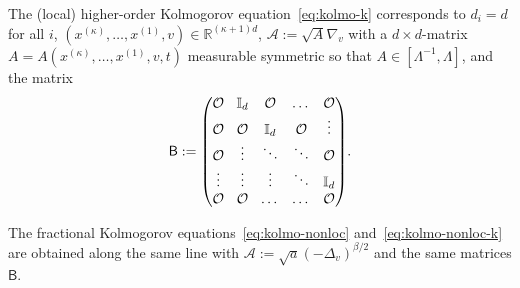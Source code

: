 \documentclass[10pt]{amsart}
\theoremstyle{definition}
\newcommand\R{{\mathbb R}}
\newcommand{\cA}{{\mathcal A}}
\newcommand{\sB}{{\mathsf B}}
\begin{document}
The (local) higher-order Kolmogorov equation~\eqref{eq:kolmo-k}
corresponds to $d_i=d$ for all $i$,
$(x^{(\kappa)},\dots,x^{(1)},v) \in \R^{(\kappa+1)d}$,
$\cA:=\sqrt{A} \nabla_{v} $ with a $d \times d$-matrix
$A=A(x^{(\kappa)},\dots,x^{(1)},v,t)$ measurable symmetric
so that $A \in [\Lambda^{-1},\Lambda]$, and the matrix
\begin{equation*}\arraycolsep4.5pt
\sB := \begin{pmatrix}
\OO & \mathbb{I}_d & \OO & \ldots & \OO \\
\OO & \OO & \mathbb{I}_d & \OO& \vdots \\
\OO & \vdots & \ddots & \ddots & \OO \\
\vdots & \vdots & \vdots & \ddots & \mathbb{I}_d \\
\OO & \OO & \ldots & \ldots & \OO
\end{pmatrix}\!.
\end{equation*}

The fractional Kolmogorov equations~\eqref{eq:kolmo-nonloc}
and~\eqref{eq:kolmo-nonloc-k} are obtained along the same line
with $\cA:= \sqrt{a} (-\Delta_v)^{\beta/2}$ and the same
matrices $\sB$.
\end{document}
